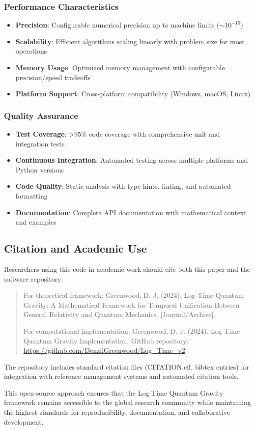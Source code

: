 \subsubsection{Performance Characteristics}

\begin{itemize}
\item \textbf{Precision}: Configurable numerical precision up to machine limits ($\sim 10^{-15}$)
\item \textbf{Scalability}: Efficient algorithms scaling linearly with problem size for most operations
\item \textbf{Memory Usage}: Optimized memory management with configurable precision/speed tradeoffs
\item \textbf{Platform Support}: Cross-platform compatibility (Windows, macOS, Linux)
\end{itemize}

\subsubsection{Quality Assurance}

\begin{itemize}
\item \textbf{Test Coverage}: >95\% code coverage with comprehensive unit and integration tests
\item \textbf{Continuous Integration}: Automated testing across multiple platforms and Python versions
\item \textbf{Code Quality}: Static analysis with type hints, linting, and automated formatting
\item \textbf{Documentation}: Complete API documentation with mathematical context and examples
\end{itemize}

\subsection{Citation and Academic Use}
\label{subsec:citation_academic_use}

Researchers using this code in academic work should cite both this paper and the software repository:

\begin{quote}
For theoretical framework: Greenwood, D. J. (2024). Log-Time Quantum Gravity: A Mathematical Framework for Temporal Unification Between General Relativity and Quantum Mechanics. [Journal/Archive].

For computational implementation: Greenwood, D. J. (2024). Log-Time Quantum Gravity Implementation. GitHub repository: \url{https://github.com/DenzilGreenwood/Log_Time_v2}
\end{quote}

The repository includes standard citation files (CITATION.cff, bibtex entries) for integration with reference management systems and automated citation tools.

This open-source approach ensures that the Log-Time Quantum Gravity framework remains accessible to the global research community while maintaining the highest standards for reproducibility, documentation, and collaborative development.